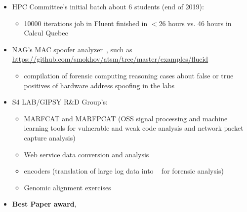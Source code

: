 \begin{itemize}
	\item HPC Committee's initial batch about 6 students (end of 2019):
	\begin{itemize}
		\item 10000 iterations job in Fluent finished in $<26$ hours vs. 46 hours in Calcul Quebec
	\end{itemize}

	\item NAG's MAC spoofer analyzer~\cite{mac-spoofer-analyzer-intro-c3s2e2014,mac-spoofer-analyzer-detail-fps2014},
	such as \url{https://github.com/smokhov/atsm/tree/master/examples/flucid}
	\begin{itemize}
		\item compilation of forensic computing reasoning cases about false or true positives of hardware address spoofing in the labs
	\end{itemize}

	\item S4 LAB/GIPSY R\&D Group's:
	\begin{itemize}
		\item MARFCAT and MARFPCAT (OSS signal processing and machine learning tools for
		vulnerable and weak code analysis and network packet capture
		analysis)~\cite{marfcat-nlp-ai2014,marfcat-sate2010-nist,fingerprinting-mal-traffic}
		\item Web service data conversion and analysis
		\item {\flucid} encoders (translation of large log data into {\flucid}~\cite{mokhov-phd-thesis-2013} for forensic analysis)
		\item Genomic alignment exercises
	\end{itemize}

	\item \textbf{Best Paper award}, 


\end{itemize}

